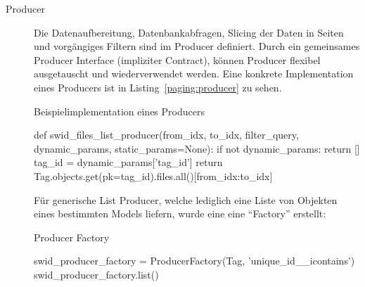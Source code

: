 \begin{description}
	\item[Producer] Die Datenaufbereitung, Datenbankabfragen, Slicing der Daten in
	Seiten und vorgängiges Filtern sind im Producer definiert. Durch ein
	gemeinsames Producer Interface (impliziter Contract\cite{contracts:2003}),
	können Producer flexibel ausgetauscht und wiederverwendet werden. Eine konkrete
	Implementation eines Producers ist in Listing~\ref{paging:producer} zu sehen.
	
	\begin{listing}[H]
\caption{Beispielimplementation eines Producers}
\label{paging:producer}
\begin{pythoncode}
def swid_files_list_producer(from_idx, to_idx, filter_query, dynamic_params, static_params=None):
 if not dynamic_params:
     return []
 tag_id = dynamic_params['tag_id']
 return Tag.objects.get(pk=tag_id).files.all()[from_idx:to_idx]
\end{pythoncode}
\end{listing}
	
	Für generische List Producer, welche lediglich eine Liste von Objekten eines
	bestimmten Models liefern, wurde eine eine \enquote{Factory} erstellt:
	
	\begin{listing}[H]
\caption{Producer Factory}
\begin{pythoncode}
swid_producer_factory = ProducerFactory(Tag, 'unique_id__icontains')
swid_producer_factory.list()
\end{pythoncode}
\end{listing}
	

\end{description}

%
%

